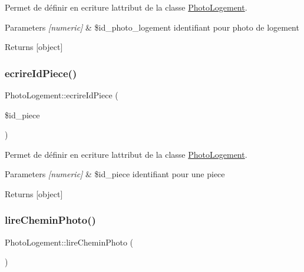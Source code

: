 Permet de définir en ecriture l\textquotesingle{}attribut de la classe \hyperlink{class_photo_logement}{Photo\+Logement}. 


\begin{DoxyParams}{Parameters}
{\em \mbox{[}numeric\mbox{]}} & \$id\+\_\+photo\+\_\+logement identifiant pour photo de logement \\
\hline
\end{DoxyParams}
\begin{DoxyReturn}{Returns}
\mbox{[}object\mbox{]} 
\end{DoxyReturn}
\mbox{\label{class_photo_logement_a1853eb65004ffac8c6fe881be6492bb1}} 
\subsubsection{\texorpdfstring{ecrire\+Id\+Piece()}{ecrireIdPiece()}}
{\footnotesize\ttfamily Photo\+Logement\+::ecrire\+Id\+Piece (\begin{DoxyParamCaption}\item[{}]{\$id\+\_\+piece }\end{DoxyParamCaption})}



Permet de définir en ecriture l\textquotesingle{}attribut de la classe \hyperlink{class_photo_logement}{Photo\+Logement}. 


\begin{DoxyParams}{Parameters}
{\em \mbox{[}numeric\mbox{]}} & \$id\+\_\+piece identifiant pour une piece \\
\hline
\end{DoxyParams}
\begin{DoxyReturn}{Returns}
\mbox{[}object\mbox{]} 
\end{DoxyReturn}
\mbox{\label{class_photo_logement_aac70000e77a33e19fb64a77485853810}} 
\subsubsection{\texorpdfstring{lire\+Chemin\+Photo()}{lireCheminPhoto()}}
{\footnotesize\ttfamily Photo\+Logement\+::lire\+Chemin\+Photo (\begin{DoxyParamCaption}{ }\end{DoxyParamCaption})}



